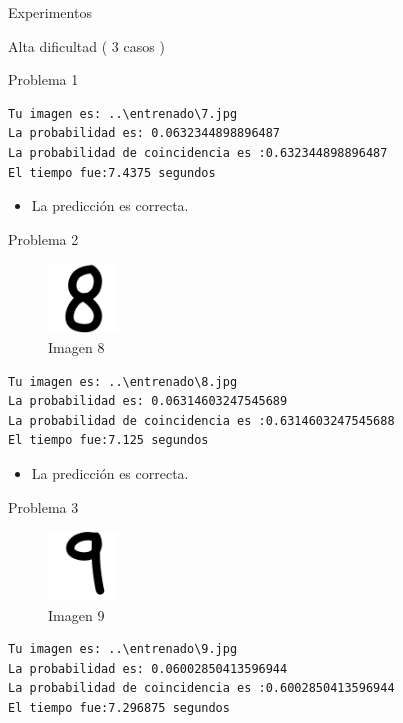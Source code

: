\documentclass[
  spanish,
  ignorenonframetext,
]{beamer}
\providecommand{\tightlist}{%
  \setlength{\itemsep}{0pt}\setlength{\parskip}{0pt}}
\begin{document}
\begin{frame}[fragile]{Experimentos}
\begin{block}{Alta dificultad ( 3 casos )}
\begin{block}{Problema 1}
\begin{verbatim}
Tu imagen es: ..\entrenado\7.jpg
La probabilidad es: 0.0632344898896487
La probabilidad de coincidencia es :0.632344898896487
El tiempo fue:7.4375 segundos
\end{verbatim}

\begin{itemize}
\tightlist
\item
  La predicción es correcta.
\end{itemize}
\end{block}

\begin{block}{Problema 2}
\protect\hypertarget{problema-2-2}{}
\begin{figure}
\centering
\includegraphics[width=0.72917in,height=\textheight]{documentacion/img/8.png}
\caption{Imagen 8}
\end{figure}

\begin{verbatim}
Tu imagen es: ..\entrenado\8.jpg
La probabilidad es: 0.06314603247545689
La probabilidad de coincidencia es :0.6314603247545688
El tiempo fue:7.125 segundos
\end{verbatim}

\begin{itemize}
\tightlist
\item
  La predicción es correcta.
\end{itemize}
\end{block}

\begin{block}{Problema 3}
\protect\hypertarget{problema-3-2}{}
\begin{figure}
\centering
\includegraphics[width=0.72917in,height=\textheight]{documentacion/img/9.png}
\caption{Imagen 9}
\end{figure}

\begin{verbatim}
Tu imagen es: ..\entrenado\9.jpg
La probabilidad es: 0.06002850413596944
La probabilidad de coincidencia es :0.6002850413596944
El tiempo fue:7.296875 segundos
\end{verbatim}


\end{block}
\end{block}
\end{frame}
\end{document}
